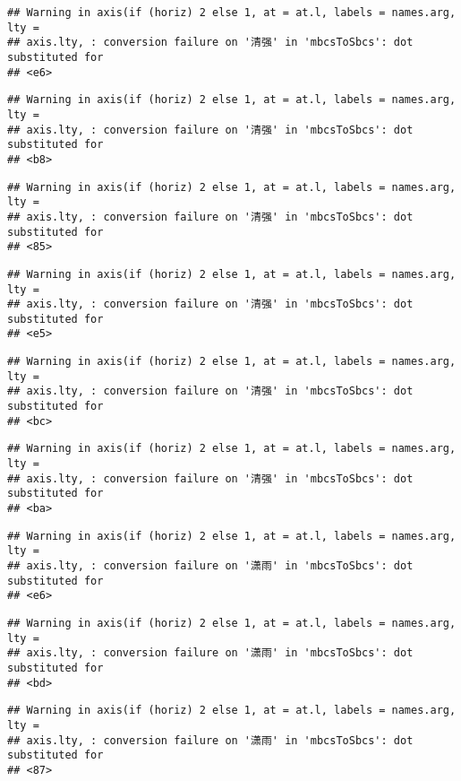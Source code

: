 \documentclass[
]{article}
\begin{document}
\begin{verbatim}
## Warning in axis(if (horiz) 2 else 1, at = at.l, labels = names.arg, lty =
## axis.lty, : conversion failure on '清强' in 'mbcsToSbcs': dot substituted for
## <e6>
\end{verbatim}

\begin{verbatim}
## Warning in axis(if (horiz) 2 else 1, at = at.l, labels = names.arg, lty =
## axis.lty, : conversion failure on '清强' in 'mbcsToSbcs': dot substituted for
## <b8>
\end{verbatim}

\begin{verbatim}
## Warning in axis(if (horiz) 2 else 1, at = at.l, labels = names.arg, lty =
## axis.lty, : conversion failure on '清强' in 'mbcsToSbcs': dot substituted for
## <85>
\end{verbatim}

\begin{verbatim}
## Warning in axis(if (horiz) 2 else 1, at = at.l, labels = names.arg, lty =
## axis.lty, : conversion failure on '清强' in 'mbcsToSbcs': dot substituted for
## <e5>
\end{verbatim}

\begin{verbatim}
## Warning in axis(if (horiz) 2 else 1, at = at.l, labels = names.arg, lty =
## axis.lty, : conversion failure on '清强' in 'mbcsToSbcs': dot substituted for
## <bc>
\end{verbatim}

\begin{verbatim}
## Warning in axis(if (horiz) 2 else 1, at = at.l, labels = names.arg, lty =
## axis.lty, : conversion failure on '清强' in 'mbcsToSbcs': dot substituted for
## <ba>
\end{verbatim}

\begin{verbatim}
## Warning in axis(if (horiz) 2 else 1, at = at.l, labels = names.arg, lty =
## axis.lty, : conversion failure on '潇雨' in 'mbcsToSbcs': dot substituted for
## <e6>
\end{verbatim}

\begin{verbatim}
## Warning in axis(if (horiz) 2 else 1, at = at.l, labels = names.arg, lty =
## axis.lty, : conversion failure on '潇雨' in 'mbcsToSbcs': dot substituted for
## <bd>
\end{verbatim}

\begin{verbatim}
## Warning in axis(if (horiz) 2 else 1, at = at.l, labels = names.arg, lty =
## axis.lty, : conversion failure on '潇雨' in 'mbcsToSbcs': dot substituted for
## <87>
\end{verbatim}
\end{document}
